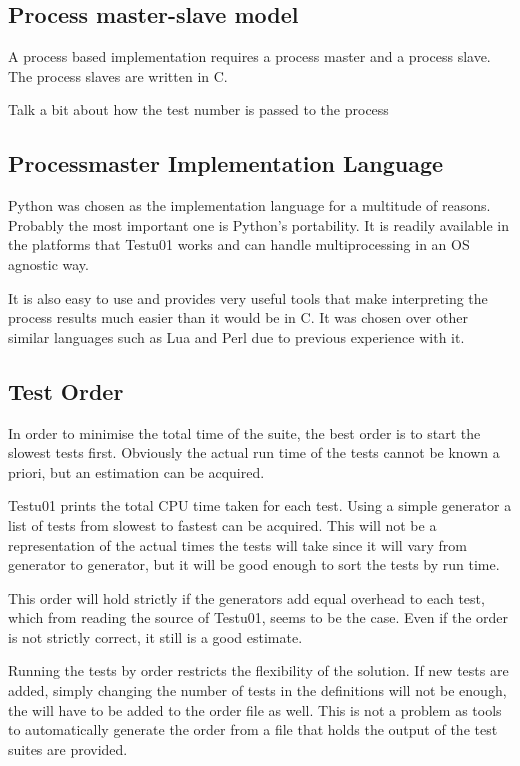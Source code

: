 \subsection{Process master-slave model}
A process based implementation requires a process master and a process slave. The process slaves are written in C.

Talk a bit about how the test number is passed to the process

\subsection{Processmaster Implementation Language}
Python was chosen as the implementation language for a multitude of reasons. Probably the most important one is Python's portability. It is readily available in the platforms that Testu01 works and can handle multiprocessing in an OS agnostic way.

It is also easy to use and provides very useful tools that make interpreting the process results much easier than it would be in C. It was chosen over other similar languages such as Lua and Perl due to previous experience with it.

\subsection{Test Order}
In order to minimise the total time of the suite, the best order is to start the slowest tests first. Obviously the actual run time of the tests cannot be known a priori, but an estimation can be acquired.

Testu01 prints the total CPU time taken for each test. Using a simple generator a list of tests from slowest to fastest can be acquired. This will not be a representation of the actual times the tests will take since it will vary from generator to generator, but it will be good enough to sort the tests by run time.

This order will hold strictly if the generators add equal overhead to each test, which from reading the source of Testu01, seems to be the case. Even if the order is not strictly correct, it still is a good estimate.

Running the tests by order restricts the flexibility of the solution. If new tests are added, simply changing the number of tests in the definitions will not be enough, the will have to be added to the order file as well. This is not a problem as tools to automatically generate the order from a file that holds the output of the test suites are provided.

